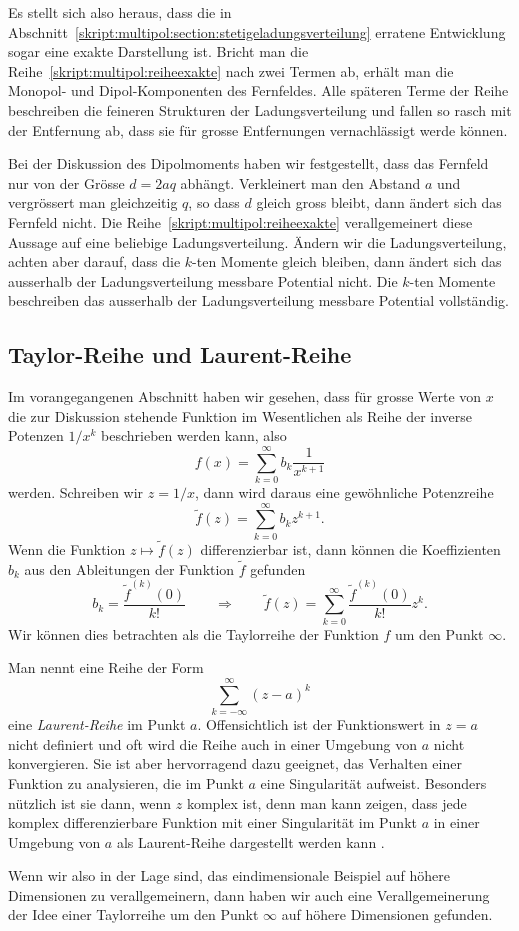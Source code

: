 Es stellt sich also heraus, dass die in
Abschnitt~\ref{skript:multipol:section:stetigeladungsverteilung}
erratene Entwicklung sogar eine exakte Darstellung ist.
Bricht man die Reihe~\eqref{skript:multipol:reiheexakte} nach zwei
Termen ab, erhält man die Monopol- und Dipol-Komponenten des
Fernfeldes.
Alle späteren Terme der Reihe beschreiben die feineren Strukturen
der Ladungsverteilung und fallen so rasch mit der Entfernung ab,
dass sie für grosse Entfernungen vernachlässigt werde können.

Bei der Diskussion des Dipolmoments haben wir festgestellt, dass das
Fernfeld nur von der Grösse $d=2aq$ abhängt.
Verkleinert man den Abstand $a$ und vergrössert man gleichzeitig $q$,
so dass $d$ gleich gross bleibt, dann ändert sich das Fernfeld nicht.
Die Reihe~\eqref{skript:multipol:reiheexakte} verallgemeinert diese
Aussage auf eine beliebige Ladungsverteilung.
Ändern wir die Ladungsverteilung, achten aber darauf, dass die
$k$-ten Momente gleich bleiben, dann ändert sich das ausserhalb der
Ladungsverteilung messbare Potential nicht.
Die $k$-ten Momente beschreiben das ausserhalb der Ladungsverteilung
messbare Potential vollständig.

\subsection{Taylor-Reihe und Laurent-Reihe}
Im vorangegangenen Abschnitt haben wir gesehen, dass für grosse Werte von
$x$ die zur Diskussion stehende Funktion im Wesentlichen als Reihe
der inverse Potenzen $1/x^k$ beschrieben werden kann, also
\[
f(x)=\sum_{k=0}^\infty b_k\frac1{x^{k+1}}
\]
werden.
Schreiben wir $z=1/x$, dann wird daraus eine gewöhnliche Potenzreihe
\[
\tilde f(z)=\sum_{k=0}^\infty b_k z^{k+1}.
\]
Wenn die Funktion $z\mapsto \tilde f(z)$ differenzierbar ist, dann
können die Koeffizienten $b_k$ aus den Ableitungen der Funktion
$\tilde f$ gefunden
\begin{equation}
b_k=\frac{\tilde f^{(k)}(0)}{k!}
\qquad\Rightarrow\qquad
\tilde f(z)
=
\sum_{k=0}^\infty \frac{\tilde f^{(k)}(0)}{k!}z^k.
\end{equation}
Wir können dies betrachten als die Taylorreihe der Funktion $f$ um
den Punkt $\infty$.

Man nennt eine Reihe der Form
\[
\sum_{k=-\infty}^{\infty} (z-a)^k
\]
eine {\em Laurent-Reihe} im Punkt $a$.
Offensichtlich ist der Funktionswert in $z=a$ nicht definiert und
oft wird die Reihe auch in einer Umgebung von $a$ nicht konvergieren.
Sie ist aber hervorragend dazu geeignet, das Verhalten einer Funktion
zu analysieren, die im Punkt $a$ eine Singularität aufweist.
Besonders nützlich ist sie dann, wenn $z$ komplex ist, denn man
kann zeigen, dass jede komplex differenzierbare Funktion mit einer
Singularität im Punkt $a$ in einer Umgebung von $a$ als Laurent-Reihe
dargestellt werden kann \cite{skript:mathsemdgl}.

Wenn wir also in der Lage sind, das eindimensionale Beispiel auf höhere
Dimensionen zu verallgemeinern, dann haben wir auch eine Verallgemeinerung
der Idee einer Taylorreihe um den Punkt $\infty$ auf höhere Dimensionen
gefunden.








